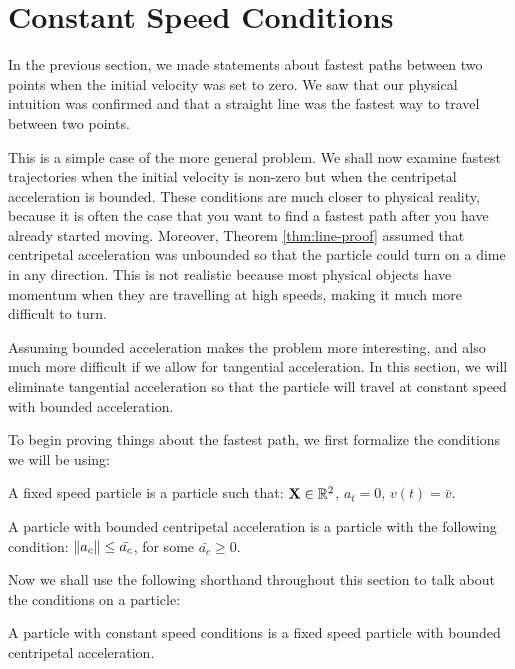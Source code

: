 
\section{Constant Speed Conditions}

In the previous section, we made statements about fastest paths between two points when the initial velocity was set to zero. We saw that our physical intuition was confirmed and that a straight line was the fastest way to travel between two points.

This is a simple case of the more general problem. We shall now examine fastest trajectories when the initial velocity is non-zero but when the centripetal acceleration is bounded. These conditions are much closer to physical reality, because it is often the case that you want to find a fastest path after you have already started moving. Moreover, Theorem \ref{thm:line-proof} assumed that centripetal acceleration was unbounded so that the particle could turn on a dime in any direction. This is not realistic because most physical objects have momentum when they are travelling at high speeds, making it much more difficult to turn.

Assuming bounded acceleration makes the problem more interesting, and also much more difficult if we allow for tangential acceleration. In this section, we will eliminate tangential acceleration so that the particle will travel at constant speed with bounded acceleration.

To begin proving things about the fastest path, we first formalize the conditions we will be using:

\begin{definition}
  A fixed speed particle is a particle such that: $\mathbf{X} \in \mathbb R^2$, $a_t = 0$, $v(t) = \bar{v}$.
\end{definition}

\begin{definition}
  A particle with bounded centripetal acceleration is a particle with the following condition: $\norm{a_c} \le \bar{a_c}$, for some $\bar{a_c} \ge 0$.
\end{definition}

Now we shall use the following shorthand throughout this section to talk about the conditions on a particle:

\begin{definition}
  A particle with constant speed conditions is a fixed speed particle with bounded centripetal acceleration.
\end{definition}

